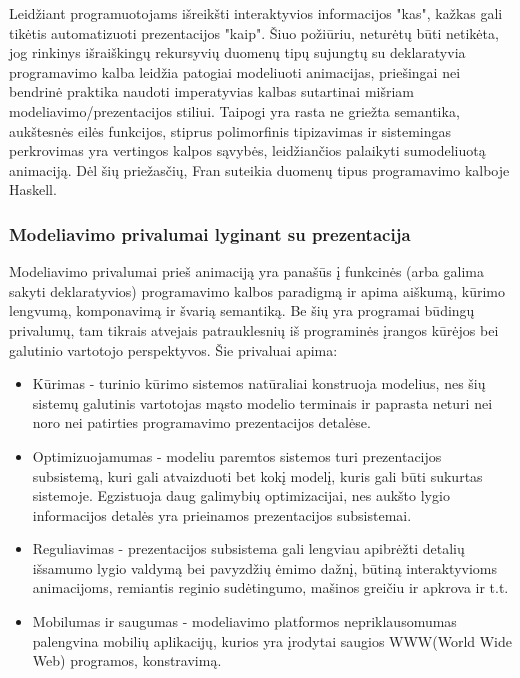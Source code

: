 Leidžiant programuotojams išreikšti interaktyvios informacijos "kas", kažkas gali tikėtis automatizuoti prezentacijos "kaip". Šiuo požiūriu, neturėtų būti netikėta, jog rinkinys išraiškingų rekursyvių duomenų tipų sujungtų su deklaratyvia programavimo kalba leidžia patogiai modeliuoti animacijas, priešingai nei bendrinė praktika naudoti imperatyvias kalbas sutartinai mišriam modeliavimo/prezentacijos stiliui. Taipogi yra rasta ne griežta semantika, aukštesnės eilės funkcijos, stiprus polimorfinis tipizavimas ir sistemingas perkrovimas yra vertingos kalpos sąvybės, leidžiančios palaikyti sumodeliuotą animaciją. Dėl šių priežasčių, Fran suteikia duomenų tipus programavimo kalboje Haskell.

\subsubsection{Modeliavimo privalumai lyginant su prezentacija}

Modeliavimo privalumai prieš animaciją yra panašūs į funkcinės (arba galima sakyti deklaratyvios) programavimo kalbos paradigmą ir apima aiškumą, kūrimo lengvumą, komponavimą ir švarią semantiką. Be šių yra programai būdingų privalumų, tam tikrais atvejais patrauklesnių iš programinės įrangos kūrėjos bei galutinio vartotojo perspektyvos. Šie privaluai apima:

\begin{itemize}

	\item Kūrimas - turinio kūrimo sistemos natūraliai konstruoja modelius, nes šių sistemų galutinis vartotojas mąsto modelio terminais ir paprasta neturi nei noro nei patirties programavimo prezentacijos detalėse.

	\item Optimizuojamumas - modeliu paremtos sistemos turi prezentacijos subsistemą, kuri gali atvaizduoti bet kokį modelį, kuris gali būti sukurtas sistemoje. Egzistuoja daug galimybių optimizacijai, nes aukšto lygio informacijos detalės yra prieinamos prezentacijos subsistemai.

	\item Reguliavimas - prezentacijos subsistema gali lengviau apibrėžti detalių išsamumo lygio valdymą bei pavyzdžių ėmimo dažnį, būtiną interaktyvioms animacijoms, remiantis reginio sudėtingumo, mašinos greičiu ir apkrova ir t.t.

	\item Mobilumas ir saugumas - modeliavimo platformos nepriklausomumas palengvina mobilių aplikacijų, kurios yra įrodytai saugios WWW(World Wide Web) programos, konstravimą.

\end{itemize}

